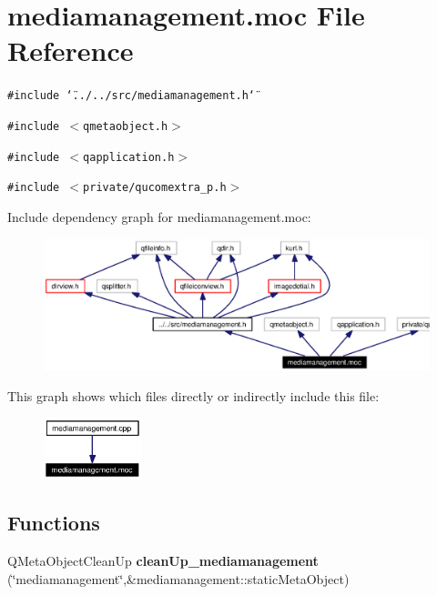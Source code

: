 \section{mediamanagement.moc File Reference}
\label{mediamanagement_8moc}


{\tt \#include \char`\"{}../../src/mediamanagement.h\char`\"{}}\par
{\tt \#include $<$qmetaobject.h$>$}\par
{\tt \#include $<$qapplication.h$>$}\par
{\tt \#include $<$private/qucomextra\_\-p.h$>$}\par


Include dependency graph for mediamanagement.moc:\begin{figure}[H]
\begin{center}
\leavevmode
\includegraphics[width=334pt]{mediamanagement_8moc__incl}
\end{center}
\end{figure}


This graph shows which files directly or indirectly include this file:\begin{figure}[H]
\begin{center}
\leavevmode
\includegraphics[width=80pt]{mediamanagement_8moc__dep__incl}
\end{center}
\end{figure}
\subsection*{Functions}
\begin{CompactItemize}
\item 
QMeta\-Object\-Clean\-Up {\bf clean\-Up\_\-mediamanagement} (\char`\"{}mediamanagement\char`\"{},\&mediamanagement::static\-Meta\-Object)
\end{CompactItemize}



